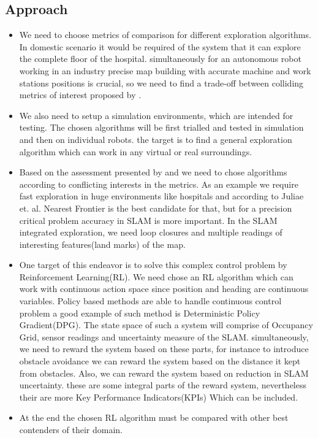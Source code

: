 \subsection{Approach}
\begin{itemize}

\item We need to choose metrics of comparison for different exploration algorithms. In domestic
scenario it would be required of the system that it can explore the complete floor of the hospital.
simultaneously for an autonomous robot working in an industry precise map building with accurate
machine and work stations positions is crucial, so we need to find a trade-off between colliding
metrics of interest proposed by \cite{Yan2015}.

\item We also need to setup a simulation environments, which are intended for testing. The chosen
algorithms will be first trialled and tested in simulation and then on individual robots. the target
is to find a general exploration algorithm which can work in any virtual or real surroundings.

\item Based on the assessment presented by \cite{Juliae2012} and \cite{Yan2015} we need to chose
algorithms according to conflicting interests in the metrics. As an example we require fast
exploration in huge environments like hospitals and according to Juliae et. al. Nearest Frontier is
the best candidate for that, but for a precision critical problem accuracy in SLAM is more
important. In the SLAM integrated exploration, we need loop closures and multiple readings of
interesting features(land marks) of the map.

 \item One target of this endeavor is to solve this complex control problem by Reinforcement
Learning(RL). We need chose an RL algorithm which can work with continuous action space since
position and heading are continuous variables. Policy based methods are able to handle continuous
control problem a good example of such method is Deterministic Policy Gradient(DPG). The state space
of such a system will comprise of Occupancy Grid, sensor readings and uncertainty measure of the
SLAM. simultaneously, we need to reward the system based on these parts, for instance to introduce
obstacle avoidance we can reward the system based on the distance it kept from obstacles. Also, we
can reward the system based on reduction in SLAM uncertainty. these are some integral parts of the
reward system, nevertheless their are more Key Performance Indicators(KPIs) Which can be included.

\item At the end the chosen RL algorithm must be compared with other best contenders of their domain.
\end{itemize}

